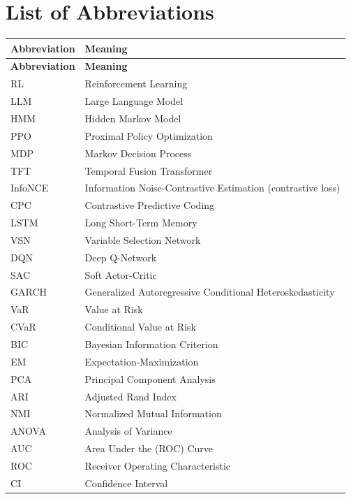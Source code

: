 \chapter*{List of Abbreviations}

\begin{longtable}{|l|>{\raggedright\arraybackslash}p{10cm}|}
\hline
\textbf{Abbreviation} & \textbf{Meaning} \\
\hline
\endfirsthead
\hline
\textbf{Abbreviation} & \textbf{Meaning} \\
\hline
\endhead
RL & Reinforcement Learning \\
\hline
LLM & Large Language Model \\
\hline
HMM & Hidden Markov Model \\
\hline
PPO & Proximal Policy Optimization \\
\hline
MDP & Markov Decision Process \\
\hline
TFT & Temporal Fusion Transformer \\
\hline
InfoNCE & Information Noise-Contrastive Estimation (contrastive loss) \\
\hline
CPC & Contrastive Predictive Coding \\
\hline
LSTM & Long Short-Term Memory \\
\hline
VSN & Variable Selection Network \\
\hline
DQN & Deep Q-Network \\
\hline
SAC & Soft Actor-Critic \\
\hline
GARCH & Generalized Autoregressive Conditional Heteroskedasticity \\
\hline
VaR & Value at Risk \\
\hline
CVaR & Conditional Value at Risk \\
\hline
BIC & Bayesian Information Criterion \\
\hline
EM & Expectation-Maximization \\
\hline
PCA & Principal Component Analysis \\
\hline
ARI & Adjusted Rand Index \\
\hline
NMI & Normalized Mutual Information \\
\hline
ANOVA & Analysis of Variance \\
\hline
AUC & Area Under the (ROC) Curve \\
\hline
ROC & Receiver Operating Characteristic \\
\hline
CI & Confidence Interval \\

\end{longtable}
